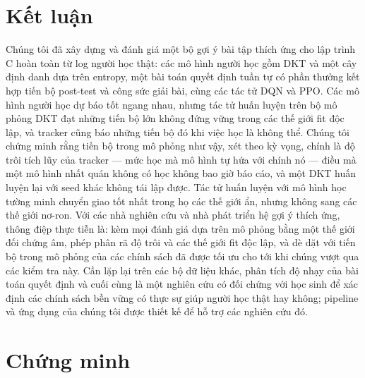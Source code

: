 \documentclass[a4paper,preprint,12pt,authoryear]{elsarticle}
\begin{document}
\section{Kết luận}\label{sec:conclusion}

Chúng tôi đã xây dựng và đánh giá một bộ gợi ý bài tập thích ứng cho lập trình C hoàn toàn từ log người học thật: các mô hình người học gồm DKT và một cây định danh dựa trên entropy, một bài toán quyết định tuần tự có phần thưởng kết hợp tiến bộ post-test và công sức giải bài, cùng các tác tử DQN và PPO. Các mô hình người học dự báo tốt ngang nhau, nhưng tác tử huấn luyện trên bộ mô phỏng DKT đạt những tiến bộ lớn không đứng vững trong các thế giới fit độc lập, và tracker cũng báo những tiến bộ đó khi việc học là không thể. Chúng tôi chứng minh rằng tiến bộ trong mô phỏng như vậy, xét theo kỳ vọng, chính là độ trôi tích lũy của tracker — mức học mà mô hình tự hứa với chính nó — điều mà một mô hình nhất quán không có học không bao giờ báo cáo, và một DKT huấn luyện lại với seed khác không tái lập được. Tác tử huấn luyện với mô hình học tường minh chuyển giao tốt nhất trong họ các thế giới ẩn, nhưng không sang các thế giới nơ-ron. Với các nhà nghiên cứu và nhà phát triển hệ gợi ý thích ứng, thông điệp thực tiễn là: kèm mọi đánh giá dựa trên mô phỏng bằng một thế giới đối chứng âm, phép phân rã độ trôi và các thế giới fit độc lập, và dè dặt với tiến bộ trong mô phỏng của các chính sách đã được tối ưu cho tới khi chúng vượt qua các kiểm tra này. Cần lặp lại trên các bộ dữ liệu khác, phân tích độ nhạy của bài toán quyết định và cuối cùng là một nghiên cứu có đối chứng với học sinh để xác định các chính sách bền vững có thực sự giúp người học thật hay không; pipeline và ứng dụng của chúng tôi được thiết kế để hỗ trợ các nghiên cứu đó.

\appendix
\section{Chứng minh}\label{app:proofs}
\end{document}
